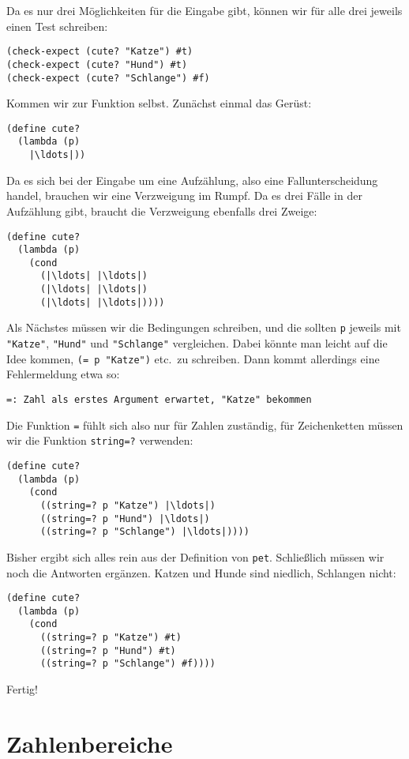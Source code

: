Da es nur drei Möglichkeiten für die Eingabe gibt, können wir für alle
drei jeweils einen Test schreiben:
%
\begin{lstlisting}
(check-expect (cute? "Katze") #t)
(check-expect (cute? "Hund") #t)
(check-expect (cute? "Schlange") #f)
\end{lstlisting}
%
Kommen wir zur Funktion selbst.  Zunächst einmal das Gerüst:
%
\begin{lstlisting}
(define cute?
  (lambda (p)
    |\ldots|))
\end{lstlisting}
%
Da es sich bei der Eingabe um eine Aufzählung, also eine
Fallunterscheidung handel, brauchen wir eine Verzweigung im Rumpf.  Da
es drei Fälle in der Aufzählung gibt, braucht die Verzweigung
ebenfalls drei Zweige:
%
\begin{lstlisting}
(define cute?
  (lambda (p)
    (cond
      (|\ldots| |\ldots|)
      (|\ldots| |\ldots|)
      (|\ldots| |\ldots|))))
\end{lstlisting}
%
Als Nächstes müssen wir die Bedingungen schreiben, und die sollten
\lstinline{p} jeweils mit \lstinline{"Katze"}, \lstinline{"Hund"} und
\lstinline{"Schlange"} vergleichen.  Dabei könnte man leicht auf die Idee
kommen, \lstinline{(= p "Katze")} etc.\ zu schreiben.  Dann kommt
allerdings eine Fehlermeldung etwa so:
%
\begin{lstlisting}
=: Zahl als erstes Argument erwartet, "Katze" bekommen
\end{lstlisting}
%
Die Funktion \lstinline{=} fühlt sich also nur für Zahlen zuständig, für
Zeichenketten müssen wir die Funktion
\lstinline{string=?} verwenden:
%
\begin{lstlisting}
(define cute?
  (lambda (p)
    (cond
      ((string=? p "Katze") |\ldots|)
      ((string=? p "Hund") |\ldots|)
      ((string=? p "Schlange") |\ldots|))))
\end{lstlisting}
%
Bisher ergibt sich alles rein aus der Definition von \lstinline{pet}.
Schließlich müssen wir noch die Antworten ergänzen.  Katzen und Hunde
sind niedlich, Schlangen nicht:
%
\begin{lstlisting}
(define cute?
  (lambda (p)
    (cond
      ((string=? p "Katze") #t)
      ((string=? p "Hund") #t)
      ((string=? p "Schlange") #f))))
\end{lstlisting}
%
Fertig!

\section{Zahlenbereiche}
\label{sec:zahlenbereiche}
\label{sec:heat-water}

